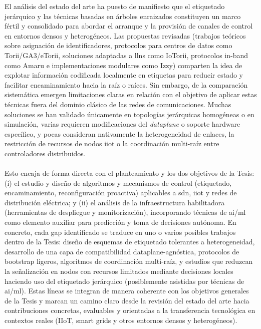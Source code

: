 El análisis del estado del arte ha puesto de manifiesto que el etiquetado jerárquico y las técnicas basadas en árboles enraizados constituyen un marco fértil y consolidado para abordar el arranque y la provisión de canales de control en entornos densos y heterogéneos. Las propuestas revisadas (trabajos teóricos sobre asignación de identificadores, protocolos para centros de datos como Torii/GA3/eTorii, soluciones adaptadas a \gls{llns} como IoTorii, protocolos in-band como Amaru e implementaciones modulares como Izzy) comparten la idea de explotar información codificada localmente en etiquetas para reducir estado y facilitar encaminamiento hacia la raíz o raíces. Sin embargo, de la comparación sistemática emergen limitaciones claras en relación con el objetivo de aplicar estas técnicas fuera del dominio clásico de las redes de comunicaciones. Muchas soluciones se han validado únicamente en topologías jerárquicas homogéneas o en simulación, varias requieren modificaciones del \textit{dataplane} o soporte hardware específico, y pocas consideran nativamente la heterogeneidad de enlaces, la restricción de recursos de nodos \gls{iiot} o la coordinación multi-raíz entre controladores distribuidos.\\
\\
Esto encaja de forma directa con el planteamiento y los dos objetivos de la Tesis: (i) el estudio y diseño de algoritmos y mecanismos de control (etiquetado, encaminamiento, reconfiguración proactiva) aplicables a \gls{sdn}, \gls{iiot} y redes de distribución eléctrica; y (ii) el análisis de la infraestructura habilitadora (herramientas de despliegue y monitorización), incorporando técnicas de \gls{ai}/\gls{ml} como elemento auxiliar para predicción y toma de decisiones autónoma. En concreto, cada gap identificado se traduce en uno o varios posibles trabajos dentro de la Tesis: diseño de esquemas de etiquetado tolerantes a heterogeneidad, desarrollo de una capa de compatibilidad dataplane-agnóstica, protocolos de bootstrap ligeros, algoritmos de coordinación multi-raíz, y estudios que reduzcan la señalización en nodos con recursos limitados mediante decisiones locales haciendo uso del etiquetado jerárquico (posiblemente asistidas por técnicas de \gls{ai}/\gls{ml}). Estas líneas se integran de manera coherente con los objetivos generales de la Tesis y marcan un camino claro desde la revisión del estado del arte hacia contribuciones concretas, evaluables y orientadas a la transferencia tecnológica en contextos reales (IIoT, smart grids y otros entornos densos y heterogéneos).




